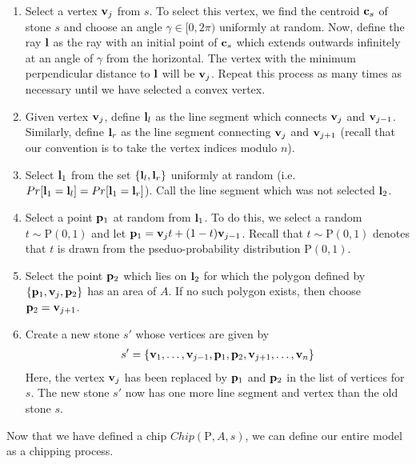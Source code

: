 \begin{enumerate}
  \item Select a vertex $\mathbf{v}_j$ from $s$. To select this vertex, we find the centroid $\mathbf{c}_s$ of stone $s$ and choose an angle $\gamma \in [0, 2\pi)$ uniformly at random. Now, define the ray $\mathbf{l}$ as the ray with an initial point of $\mathbf{c}_s$ which extends outwards infinitely at an angle of $\gamma$ from the horizontal. The vertex with the minimum perpendicular distance to $\mathbf{l}$ will be $\mathbf{v}_j$. Repeat this process as many times as necessary until we have selected a convex vertex.
  \item Given vertex $\mathbf{v}_j$, define $\mathbf{l}_l$ as the line segment which connects $\mathbf{v}_j$ and $\mathbf{v}_{{j-1}}$. Similarly, define $\mathbf{l}_r$ as the line segment connecting $\mathbf{v}_j$ and $\mathbf{v}_{{j+1}}$ (recall that our convention is to take the vertex indices modulo $n$).
  \item Select $\mathbf{l}_1$ from the set $\{ \mathbf{l}_l, \mathbf{l}_r \}$ uniformly at random (i.e. $Pr[\mathbf{l}_1 = \mathbf{l}_l] = Pr[\mathbf{l}_1 = \mathbf{l}_r]$). Call the line segment which was not selected $\mathbf{l}_2$.
  \item Select a point $\mathbf{p}_1$ at random from $\mathbf{l}_1$. To do this, we select a random $t \sim \mathrm{P}(0,1)$ and let $\mathbf{p}_1 = \mathbf{v}_j t + (1-t) \mathbf{v}_{{j-1}}$. Recall that $t \sim \mathrm{P}(0,1)$ denotes that $t$ is drawn from the pseduo-probability distribution $\mathrm{P}(0,1)$.
  \item Select the point $\mathbf{p}_2$ which lies on $\mathbf{l}_2$ for which the polygon defined by $\{\mathbf{p}_1, \mathbf{v}_j, \mathbf{p}_2\}$ has an area of $A$. If no such polygon exists, then choose $\mathbf{p}_2 = \mathbf{v}_{{j+1}}$.
  \item Create a new stone $s'$ whose vertices are given by
    \begin{eqnarray*}
      s' = \{ \mathbf{v}_1, \ldots, \mathbf{v}_{j-1}, \mathbf{p}_1, \mathbf{p}_2, \mathbf{v}_{j+1}, \ldots, \mathbf{v}_n \}
    \end{eqnarray*}
    Here, the vertex $\mathbf{v}_j$ has been replaced by $\mathbf{p}_1$ and $\mathbf{p}_2$ in the list of vertices for $s$. The new stone $s'$ now has one more line segment and vertex than the old stone $s$.
\end{enumerate}

Now that we have defined a chip $Chip(\mathrm{P}, A, s)$, we can define our entire model as a chipping process.

